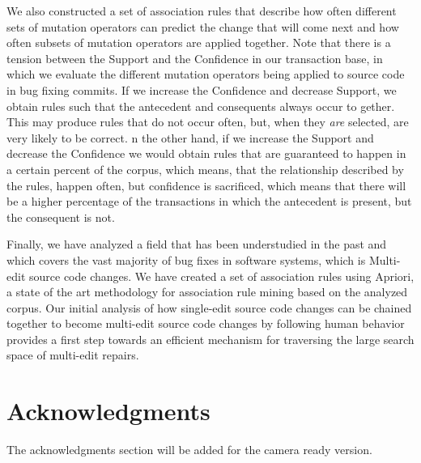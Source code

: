 \documentclass[conference]{IEEEtran}
\begin{document}
We also constructed a set of association rules that describe 
how often different sets of mutation operators can predict the change that will 
come next and how often subsets of mutation operators are applied together.
Note that there is a tension between the Support and the Confidence in our transaction 
base, in which we 
evaluate the different mutation operators being applied to source code in bug 
fixing commits. 
If we increase the Confidence and decrease Support, we obtain rules such that
the antecedent and consequents always occur to gether.  This may produce rules that
do not occur often, but, when they \emph{are} selected, are very likely to be
correct. n the other hand, if 
we increase the Support and decrease the Confidence we would obtain rules that 
are guaranteed to happen in a certain percent of the corpus, which means, that 
the relationship described by the rules, happen often, but confidence is 
sacrificed, which means that there will be a higher percentage of the 
transactions in which the antecedent is present, but the consequent is not. 

Finally, we have analyzed a field that has been understudied in the past and which covers 
the vast majority of bug fixes in software systems, which is Multi-edit source code changes. 
We have created a set of association rules using Apriori, a state of the art
methodology for association rule mining based on the analyzed corpus. Our
initial analysis of how single-edit source code changes can be chained together 
to become multi-edit source code changes by following human behavior provides a
first step towards an efficient mechanism for traversing the large search space
of multi-edit repairs.





\section*{Acknowledgments}
The acknowledgments section will be added for the camera ready version. 





\end{document}
